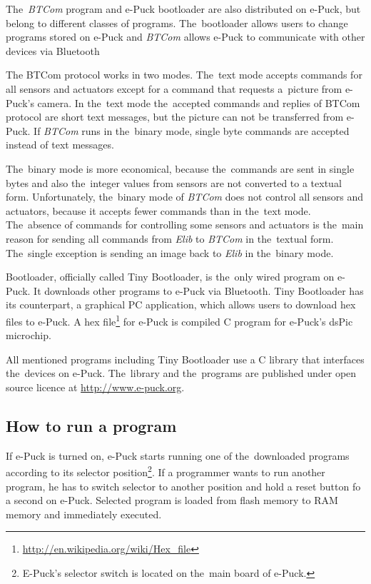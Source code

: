   The~{\it BTCom} program and e-Puck bootloader are also distributed on e-Puck, but belong to different classes of programs. 
  The~bootloader allows users to change programs stored on e-Puck and
  {\it BTCom} allows e-Puck to communicate with other devices via Bluetooth
  
  The BTCom protocol works in two modes. The~text mode accepts commands for
  all sensors and actuators except for a command that requests a~picture 
  from e-Puck's camera. 
  In the~text mode the~accepted commands and replies of BTCom protocol are short text messages,
  but the picture can not be transferred from e-Puck.
  If {\it BTCom} runs in the~binary mode, 
  single byte commands are accepted instead of text messages.

  The~binary mode is more economical, 
  because the~commands are sent in single bytes and also the~integer values from sensors
  are not converted to a textual form.
  Unfortunately, the~binary mode of {\it BTCom} does not control all sensors and actuators, 
  because it accepts fewer commands than in the~text mode.
  The~absence of commands for controlling some sensors and actuators is the~main reason 
  for sending all commands from {\it Elib} to {\it BTCom} in the~textual form. 
  The~single exception is sending an image back to {\it Elib} in the~binary mode.
   
  Bootloader, officially called Tiny Bootloader\cite{tiny},
  is the~only wired program on e-Puck. It downloads other programs to e-Puck via Bluetooth. 
  Tiny Bootloader has its counterpart, a graphical PC application,
  which allows users to download hex files to e-Puck.
  A hex file\footnote{\small{\url{http://en.wikipedia.org/wiki/Hex_file}}} 
  for e-Puck is compiled C program for e-Puck's dsPic microchip. 
   
  All mentioned programs including Tiny Bootloader use a C library that interfaces the~devices on e-Puck. 
  The~library and the~programs are published under open source licence at
  \url{http://www.e-puck.org}.

  \subsection*{How to run a program} %
  If e-Puck is turned on, e-Puck starts running one of the~downloaded programs 
  according to its selector position\footnote{ E-Puck's selector switch is located on the~main board of e-Puck.}. 
  If a programmer wants to run another program, he has to switch selector to another position
  and hold a  reset button fo a second on e-Puck. Selected program is loaded from flash memory
  to RAM memory and immediately executed.	
   

